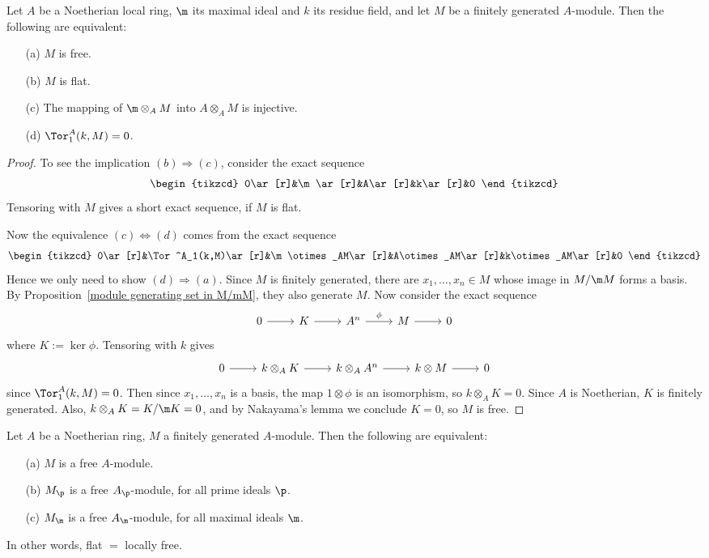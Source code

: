 \begin{exercise}\label{Noe local ring flat iff free}
Let $A$ be a Noetherian local ring, $\m$ its maximal ideal and $k$ its residue field, and let $M$ be a finitely generated $A$-module. Then the following are equivalent:
\begin{itemize}
\item[(a)] $M$ is free.
\item[(b)] $M$ is flat.
\item[(c)] The mapping of $\m\otimes_AM$ into $A\otimes_AM$ is injective.
\item[(d)] $\Tor^A_1(k,M)=0$.
\end{itemize}
\end{exercise}
\begin{proof}
To see the implication $(b)\Rightarrow(c)$, consider the exact sequence
\[\begin{tikzcd}
0\ar[r]&\m\ar[r]&A\ar[r]&k\ar[r]&0
\end{tikzcd}\]
Tensoring with $M$ gives a short exact sequence, if $M$ is flat.\par
Now the equivalence $(c)\Leftrightarrow(d)$ comes from the exact sequence
\[\begin{tikzcd}
0\ar[r]&\Tor^A_1(k,M)\ar[r]&\m\otimes_AM\ar[r]&A\otimes_AM\ar[r]&k\otimes_AM\ar[r]&0
\end{tikzcd}\]
Hence we only need to show $(d)\Rightarrow(a)$. Since $M$ is finitely generated, there are $x_1,\dots,x_n\in M$ whose image in $M/\m M$ forms a basis. By Proposition~\ref{module generating set in M/mM}, they also generate $M$. Now consider the exact sequence
\[\begin{tikzcd}
0\ar[r]&K\ar[r]&A^n\ar[r,"\phi"]&M\ar[r]&0
\end{tikzcd}\]
where $K:=\ker\phi$. Tensoring with $k$ gives
\[\begin{tikzcd}
0\ar[r]&k\otimes_AK\ar[r]&k\otimes_AA^n\ar[r]&k\otimes M\ar[r]&0
\end{tikzcd}\]
since $\Tor^A_1(k,M)=0$. Then since $x_1,\dots,x_n$ is a basis, the map $1\otimes\phi$ is an isomorphism, so $k\otimes_AK=0$. Since $A$ is Noetherian, $K$ is finitely generated. Also, $k\otimes_AK=K/\m K=0$, and by Nakayama's lemma we conclude $K=0$, so $M$ is free.
\end{proof}
\begin{exercise}
Let $A$ be a Noetherian ring, $M$ a finitely generated $A$-module. Then the following are equivalent:
\begin{itemize}
\item[(a)] $M$ is a free $A$-module.
\item[(b)] $M_\p$ is a free $A_\p$-module, for all prime ideals $\p$.
\item[(c)] $M_\m$ is a free $A_\m$-module, for all maximal ideals $\m$.
\end{itemize}
In other words, flat $=$ locally free.
\end{exercise}
